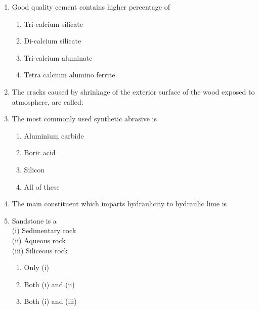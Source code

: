 \documentclass[11pt,a4paper]{article}
\begin{document}
\begin{enumerate}
\begin{enumerate}[label=\Alph*.]
\end{enumerate}
\item{Good quality cement contains higher percentage of}
\begin{enumerate}[label=\Alph*.]
\item{Tri-calcium silicate}
\item{Di-calcium silicate}
\item{Tri-calcium aluminate}
\item{Tetra calcium alumino ferrite}
\end{enumerate}
\item{The cracks caused by shrinkage of the exterior surface of the wood exposed to atmosphere, are called:}
\\
\item{The most commonly used synthetic abrasive is}
\begin{enumerate}[label=\Alph*.]
\item{Aluminium carbide}
\item{Boric acid}
\item{Silicon}
\item{All of these}
\end{enumerate}
\item{The main constituent which imparts hydraulicity to hydraulic lime is}
\\
\item{Sandstone is a \\
 (i) Sedimentary rock \\
 (ii) Aqueous rock \\
 (iii) Siliceous rock}
\begin{enumerate}[label=\Alph*.]
\item{Only (i)}
\item{Both (i) and (ii)}
\item{Both (i) and (iii)}

\end{enumerate}
\end{enumerate}
\end{document}
